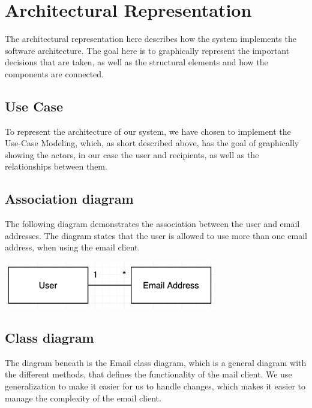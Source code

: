 \documentclass{article}
\begin{document}
\newpage

\section*{Architectural Representation}

The architectural representation here describes how the system implements the software architecture. The goal here is to graphically represent the important decisions that are taken, as well as the structural elements and how the components are connected.

\subsection*{Use Case}
To represent the architecture of our system, we have chosen to implement the Use-Case Modeling, which, as short described above, has the goal of graphically showing the actors, in our case the user and recipients, as well as the relationships between them.

\subsection*{Association diagram}
The following diagram demonstrates the association between the user and email addresses. The diagram states that the user is allowed to use more than one email address, when using the email client. 

\begin{center}
\includegraphics[width=350px, keepaspectratio]{UML_Association..png}\\[1cm] 
\end{center} 

\newpage

\subsection*{Class diagram}
The diagram beneath is the Email class diagram, which is a general diagram with the different methods, that defines the functionality of the mail client. We use generalization to make it easier for us to handle changes, which makes it easier to manage the complexity of the email client. 
\vspace{6 mm}
\end{document}
